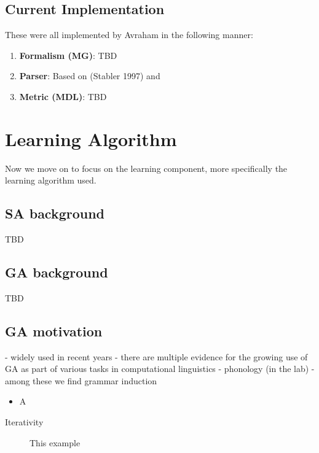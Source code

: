\documentclass{article}
\begin{document}
\subsection{Current Implementation} 
These were all implemented by Avraham in the following manner:
\begin{enumerate}
  \item \textbf{Formalism (MG)}: TBD
  \item \textbf{Parser}: Based on (Stabler 1997) and 
  \item \textbf{Metric (MDL)}: TBD
\end{enumerate}

\clearpage
\section{Learning Algorithm} 
Now we move on to focus on the learning component, more specifically the learning algorithm used.

\subsection{SA background} %
TBD
\subsection{GA background} %
TBD
\subsection{GA motivation} %
- widely used in recent years
- there are multiple evidence for the growing use of GA as part of various tasks in computational linguistics
- phonology (in the lab)
- among these we find grammar induction

\begin{itemize}
  \item A
\end{itemize}

\begin{description}
   \item[Iterativity] This example
\end{description}
\end{document}

